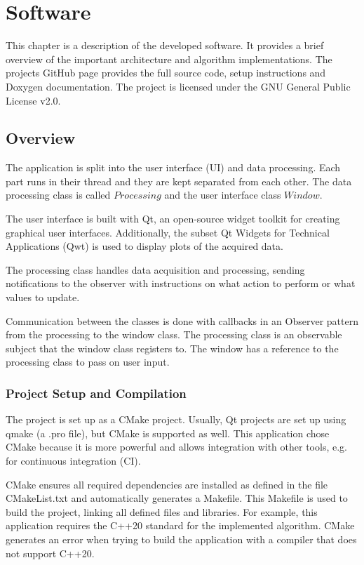\chapter{Software}\label{cp:sw}

This chapter is a description of the developed software. It provides a brief overview of the important architecture and algorithm implementations. The projects GitHub page provides the full source code, setup instructions and Doxygen documentation.\cite{Belinda2020} %
The project is licensed under the GNU General Public License v2.0.

\section{Overview}
The application is split into the user interface (UI) and data processing. Each part runs in their thread and they are kept separated from each other. The data processing class is called $Processing$ and the user interface class $Window$. 

The user interface is built with Qt, an open-source widget toolkit for creating graphical user interfaces. Additionally, the subset Qt Widgets for Technical Applications (Qwt) is used to display plots of the acquired data.

The processing class handles data acquisition and processing, sending notifications to the observer with instructions on what action to perform or what values to update.

Communication between the classes is done with callbacks in an Observer pattern from the processing to the window class. The processing class is an observable subject that the window class registers to. The window has a reference to the processing class to pass on user input.


\subsection{Project Setup and Compilation}
The project is set up as a CMake project. Usually, Qt projects are set up using qmake (a .pro file), but CMake is supported as well. This application chose CMake because it is more powerful and allows integration with other tools, e.g. for continuous integration (CI). %

CMake ensures all required dependencies are installed as defined in the file CMakeList.txt and automatically generates a Makefile. This Makefile is used to build the project, linking all defined files and libraries.
For example, this application requires the C++20 standard for the implemented algorithm. CMake generates an error when trying to build the application with a compiler that does not support C++20.

